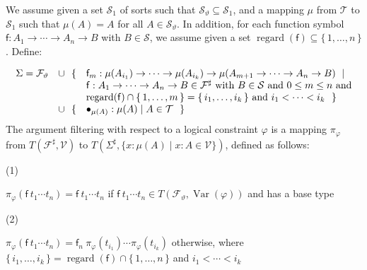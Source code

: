 \documentclass[10pt,a4paper]{amsart}
\begin{document}
We assume given a set $\mathcal{S}_{1}$ of sorts such that ${\mathcal{S}}_{\vartheta}\subseteq\mathcal{S}_{1}$, and a mapping $\mu$ from $\mathcal{T}$ to $\mathcal{S}_{1}$ such that $\mu(A)=A$ for all $A\in{\mathcal{S}}_{\vartheta}$. In addition, for each function symbol $\mathsf{f}:{A}_{1}\rightarrow\cdots\rightarrow{A}_{n}\rightarrow B$ with $B\in\mathcal{S}$, we assume given a set $\operatorname{regard}(\mathsf{f})\subseteq\{\,1,\ldots,n\,\}$. Define:\par
    \[\begin{array}[]{rcl}\Sigma={\mathcal{F}}_{\vartheta}&\cup\ \ \{&\mathsf{f}_{m}:\mu(A_{i_{1}})\rightarrow\dots\rightarrow\mu(A_{i_{k}})\rightarrow\mu(A_{m+1}\rightarrow\dots\rightarrow A_{n}\rightarrow B)\ \mid\\
&&\mathsf{f}:{A}_{1}\rightarrow\cdots\rightarrow{A}_{n}\rightarrow B\in\mathcal{F}^{\sharp}\ \text{with}\ B\in\mathcal{S}\ \text{and}\ 0\leq m\leq n\ \text{and}\\
&&\operatorname{regard}(\mathsf{f})\cap\{\,1,\ldots,m\,\}=\{\,{i}_{1},\ldots,{i}_{k}\,\}\ \text{and}\ {i}_{1}<\cdots<{i}_{k}\ \ \}\\
&\cup\ \ \{&\bullet_{\mu(A)}:\mu(A)\mid A\in\mathcal{T}\ \ \}\\
\end{array}\]    
The argument filtering with respect to a logical constraint $\varphi$ is a mapping $\pi_{\varphi}$ from $T(\mathcal{F}^{\sharp},\mathcal{V})$ to $T(\Sigma^{\sharp},\{x:\mu(A)\mid x:A\in\mathcal{V}\})$, defined as follows:\par
  
\par\noindent  (1) 
 
$\pi_{\varphi}({\mathsf{f}}\ {{t}_{1}\cdots{t}_{n}})={\mathsf{f}}\ {{t}_{1}\cdots{t}_{n}}$ if ${\mathsf{f}}\ {{t}_{1}\cdots{t}_{n}}\in T({\mathcal{F}}_{\vartheta},\operatorname{Var}(\varphi))$ and has a base type\par
 
 
 
\par\noindent  (2) 
 
$\pi_{\varphi}({\mathsf{f}}\ {{t}_{1}\cdots{t}_{n}})={\mathsf{f}_{n}}\ {\pi_{\varphi}(t_{i_{1}})\cdots\pi_{\varphi}(t_{i_{k}})}$ otherwise, where $\{\,{i}_{1},\ldots,{i}_{k}\,\}=\operatorname{regard}(\mathsf{f})\cap\{\,1,\ldots,n\,\}$ and ${i}_{1}<\cdots<{i}_{k}$\par
 
\end{document}
